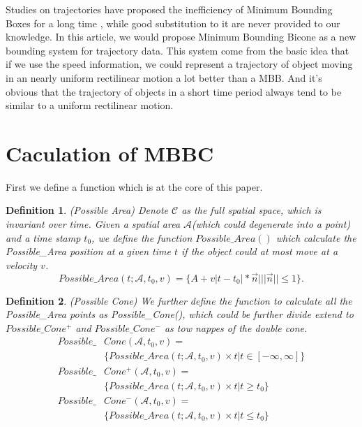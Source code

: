 \documentclass[sigplan]{acmart}
\newtheorem{myDef}{Definition}
\begin{document}
Studies on trajectories have proposed the inefficiency of Minimum Bounding Boxes for a long time \cite{pfoser2000novel}, while good substitution to it are never provided to our knowledge. In this article, we would propose Minimum Bounding Bicone as a new bounding system for trajectory data. This system come from the basic idea that if we use the speed information, we could represent a trajectory of object moving in an nearly uniform rectilinear motion a lot better than a MBB. And it's obvious that the trajectory of objects in a short time period always tend to be similar to a uniform rectilinear motion.\par



\section{Caculation of MBBC}
First we define a function which is at the core of this paper.
\begin{myDef}
  (Possible Area) Denote $\mathcal{C}$ as the full spatial space, which is invariant over time. Given a spatial area $\mathcal{A}$(which could degenerate into a point) and a time stamp $t_0$, we define the function $Possible\_Area()$ which calculate the Possible\_Area position at a given time $t$ if the object could at most move at a velocity $v$.
  $$
  Possible\_Area(t;\mathcal{A}, t_0, v) = \{A+ v|t-t_0|* \vec{n} \big| ||\vec{n}|| \leq 1\}.
  $$
\end{myDef}
\begin{myDef}
  (Possible Cone) We further define the function to calculate all the Possible\_Area points as Possible\_Cone(), which could be further divide extend to $Possible\_Cone^+ $ and $Possible\_Cone^-$ as tow nappes of the double cone.
  $$
  \begin{aligned}
  Possible\_&Cone(\mathcal{A}, t_0, v)=\\
  &\{Possible\_Area(t;\mathcal{A}, t_0, v)\times t | t\in [-\infty, \infty]\}\\
  Possible\_&Cone^+ (\mathcal{A}, t_0, v)=\\
  &\{Possible\_Area(t;\mathcal{A}, t_0, v)\times t \big | t\geq t_0\}\\
  Possible\_&Cone^-(\mathcal{A}, t_0, v)=\\
  &\{Possible\_Area(t;\mathcal{A}, t_0, v)\times t \big | t\leq t_0\}
  \end{aligned}
  $$
\end{myDef}
\end{document}
